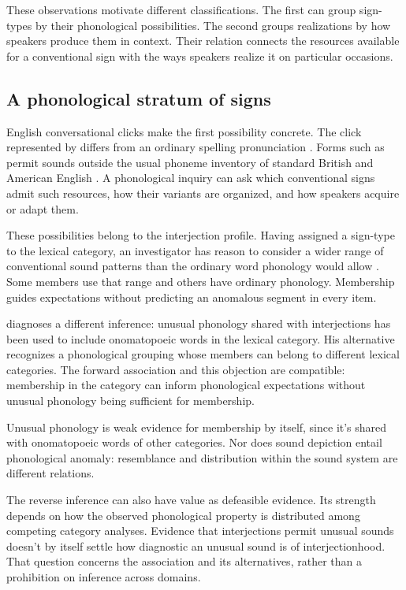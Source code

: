 \documentclass[12pt]{article}
\begin{document}
These observations motivate different classifications. The first can group
sign-types by their phonological possibilities. The second groups realizations
by how speakers produce them in context. Their relation connects
the resources available for a conventional sign with the ways speakers
realize it on particular occasions.

\subsection{A phonological stratum of signs}

English conversational clicks make the first possibility concrete. The
click represented by  differs from an ordinary spelling
pronunciation \citep[147]{wilkins1992}. Forms such as  permit
sounds outside the usual phoneme inventory of standard British and
American English \citep[74, 853]{quirk1985}. A phonological inquiry can
ask which conventional signs admit such resources, how their variants are
organized, and how speakers acquire or adapt them.

These possibilities belong to the interjection profile. Having
assigned a sign-type to the lexical category, an investigator has reason to
consider a wider range of conventional sound patterns than the ordinary
word phonology would allow \citep[105--106]{ameka1992}. Some members
use that range and others have ordinary phonology. Membership guides
expectations without predicting an anomalous segment in every item.

\textcite[112--113]{ameka1992} diagnoses a different inference: unusual
phonology shared with interjections has been used to include onomatopoeic
words in the lexical category. His alternative recognizes a phonological
grouping whose members can belong to different lexical categories. The
forward association and this objection are compatible: membership in the
category can inform phonological expectations without unusual phonology
being sufficient for membership.

Unusual phonology is weak evidence for membership by itself, since it's
shared with onomatopoeic words of other categories. Nor does sound
depiction entail phonological anomaly: resemblance and distribution within
the sound system are different relations.

The reverse inference can also have value as defeasible evidence.
Its strength depends on how the observed phonological property is
distributed among competing category analyses. Evidence that interjections
permit unusual sounds doesn't by itself settle how diagnostic an unusual
sound is of interjectionhood. That question concerns the association
and its alternatives, rather than a prohibition on inference across domains.
\end{document}
